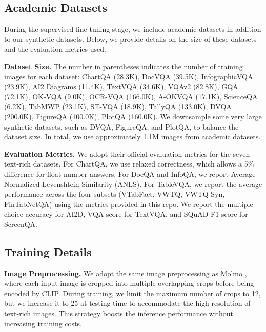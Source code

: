 \begin{itemize}[noitemsep, topsep=0pt, leftmargin=*]
\end{itemize}

\subsection{Academic Datasets}
During the supervised fine-tuning stage, we include academic datasets in addition to our synthetic datasets. Below, we provide details on the size of these datasets and the evaluation metrics used.

\smallbreak
\noindent \textbf{Dataset Size.}
The number in parentheses indicates the number of training images for each dataset: ChartQA (28.3K), DocVQA (39.5K), InfographicVQA (23.9K), AI2 Diagrams (11.4K), TextVQA (34.6K), VQAv2 (82.8K), GQA (72.1K), OK-VQA (9.0K), OCR-VQA (166.0K), A-OKVQA (17.1K), ScienceQA (6.2K), TabMWP (23.1K), ST-VQA (18.9K), TallyQA (133.0K), DVQA (200.0K), FigureQA (100.0K), PlotQA (160.0K).
We downsample some very large synthetic datasets, such as DVQA, FigureQA, and PlotQA, to balance the dataset size. 
In total, we use approximately 1.1M images from academic datasets.

\smallbreak
\noindent \textbf{Evaluation Metrics.} We adopt their official evaluation metrics for the seven text-rich datasets. 
For ChartQA, we use relaxed correctness, which allows a 5\% difference for float number answers. 
For DocQA and InfoQA, we report Average Normalized Levenshtein Similarity (ANLS).
For TableVQA, we report the average performance across the four subsets (VTabFact, VWTQ, VWTQ-Syn, FinTabNetQA) using the metrics provided in this \href{https://github.com/naver-ai/tablevqabench}{repo}.
We report the multiple choice accuracy for AI2D, VQA score \cite{balanced_vqa_v2} for TextVQA, and SQuAD F1 score \cite{rajpurkar-etal-2018-know} for ScreenQA.

\subsection{Training Details}

\smallbreak
\noindent \textbf{Image Preprocessing.} We adopt the same image preprocessing as Molmo \citep{deitke2024molmo}, where each input image is cropped into multiple overlapping crops before being encoded by CLIP. 
During training, we limit the maximum number of crops to 12, but we increase it to 25 at testing time to accommodate the high resolution of text-rich images. 
This strategy boosts the inference performance without increasing training costs.

